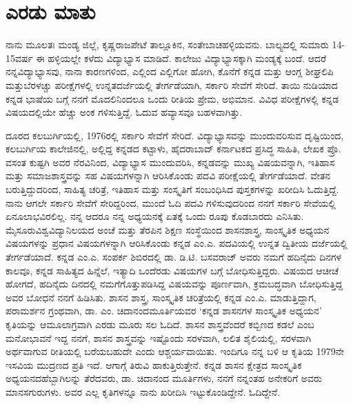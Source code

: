 
\chapter{ಎರಡು ಮಾತು}

ನಾನು ಮೂಲತಃ ಮಂಡ್ಯ ಜಿಲ್ಲೆ, ಕೃಷ್ಣರಾಜಪೇಟೆ ತಾಲ್ಲೂಕಿನ, ಸಂತೇಬಾಚಹಳ್ಳಿಯವನು. ಬಾಲ್ಯದಲ್ಲಿ ಸುಮಾರು 14-15\break ವರ್ಷ ಈ ಹಳ್ಳಿಯಲ್ಲೇ ಕಳೆದು ವಿದ್ಯಾಭ್ಯಾಸ ಮಾಡಿದೆ. ಕಾಲೇಜು ವಿದ್ಯಾಭ್ಯಾಸಕ್ಕಾಗಿ ಮಂಡ್ಯಕ್ಕೆ ಬಂದೆ. ಆದರೆ ನನ್ನ\break ವಿದ್ಯಾಭ್ಯಾಸವು, ನಾನಾ ಕಾರಣಗಳಿಂದ, ಎಲ್ಲಿಂದ ಎಲ್ಲಿಗೋ ಹೋಗಿ, ಕೊನೆಗೆ ಕನ್ನಡ ಮತ್ತು ಆಂಗ್ಲ ಶೀಘ್ರಲಿಪಿ ಮತ್ತು\break ಬೆರಳಚ್ಚು ಪರೀಕ್ಷೆಗಳಲ್ಲಿ ಉನ್ನತದರ್ಜೆಯಲ್ಲಿ ತೇರ್ಗಡೆಯಾಗಿ, ಸರ್ಕಾರಿ ಸೇವೆಗೆ ಸೇರಿದೆ. ತಾಯಿ ನುಡಿಯಾದ ಕನ್ನಡ ಭಾಷೆಯ ಬಗ್ಗೆ ನನಗೆ ಮೊದಲಿನಿಂದಲೂ ಒಂದು ರೀತಿಯ ಪ್ರೇಮ, ಅಭಿಮಾನ. ವಿವಿಧ ಪರೀಕ್ಷೆಗಳಲ್ಲಿ ಕನ್ನಡ ವಿಷಯದಲ್ಲಿಯೇ ಹೆಚ್ಚು ಅಂಕ ಗಳಿಸುತ್ತಿದ್ದೆ. ಓದುವ ಹವ್ಯಾಸವೂ ಬಹಳವಾಗಿತ್ತು. 

ದೂರದ ಕಲಬುರ್ಗಿಯಲ್ಲಿ, 1976ರಲ್ಲಿ ಸರ್ಕಾರಿ ಸೇವೆಗೆ ಸೇರಿದೆ. ವಿದ್ಯಾಭ್ಯಾಸವನ್ನು ಮುಂದುವರಿಸುವ ದೃಷ್ಟಿಯಿಂದ, ಕಲಬುರ್ಗಿಯ ಕಾಲೇಜಿನಲ್ಲಿ, ಅಲ್ಲಿದ್ದ ಕನ್ನಡದ ಕಟ್ಟಾಳು, ಹೈದರಾಬಾದ್​ ಕರ್ನಾಟಕದ ಪ್ರಸಿದ್ಧ ಸಾಹಿತಿ, ಲೇಖಕ ಪ್ರೊ. ವಸಂತ ಕುಷ್ಟಗಿ ಅವರ ನೆರವಿನಿಂದ, ವಿದ್ಯಾಭ್ಯಾಸ ಮುಂದುವರಿಸಿ, ಕನ್ನಡವನ್ನು ಮುಖ್ಯ ವಿಷಯವನ್ನಾಗಿ, ಇತಿಹಾಸ ಮತ್ತು ಸಮಾಜಶಾಸ್ತ್ರವನ್ನು ಸಹ ವಿಷಯಗಳನ್ನಾಗಿ ಆರಿಸಿಕೊಂಡು ಪದವಿ ಪರೀಕ್ಷೆಯಲ್ಲಿ ತೇರ್ಗಡೆಯಾದೆ. ವೇತನ ಬರುತ್ತಿದ್ದುದರಿಂದ, ಸಾಹಿತ್ಯ ಚರಿತ್ರೆ, ಇತಿಹಾಸ ಮತ್ತು ಸಂಸ್ಕೃತಿಗೆ ಸಂಬಂಧಿಸಿದ ಪುಸ್ತಕಗಳನ್ನು ಖರೀದಿಸಿ ಓದುತ್ತಿದ್ದೆ. ನಾನು ಆಗಲೇ ಸರ್ಕಾರಿ ಸೇವೆಗೆ ಸೇರಿದ್ದರಿಂದ, ಮುಂದೆ ಓದಿ ಪದವಿ ಗಳಿಸುವುದರಿಂದ ನನಗೆ ಸರ್ಕಾರಿ ಸೇವೆಯಲ್ಲಿ ಏನೂ\break ಲಾಭವಿರಲಿಲ್ಲ. ನನ್ನ ಆದರೂ ನನ್ನ ಅಧ್ಯಯನಕ್ಕೆ ಏತಕ್ಕೆ ಒಂದು ರೂಪು ಕೊಡಬಾರದು ಎನಿಸಿತು. ಮೈಸೂರು\break ವಿಶ್ವವಿದ್ಯಾನಿಲಯದ ಅಂಚೆ ಮತ್ತು ತೆರಪಿನ ಶಿಕ್ಷಣ ಸಂಸ್ಥೆಯಿಂದ ಶಾಸನಶಾಸ್ತ್ರ, ಸಾಂಸ್ಕೃತಿಕ ಅಧ್ಯಯನ ವಿಷಯಗಳನ್ನು ಪ್ರಧಾನ ವಿಷಯಗಳನ್ನಾಗಿ ಆರಿಸಿಕೊಂಡು ಕನ್ನಡ ಎಂ.ಎ. ಪದವಿಯಲ್ಲಿ ಉನ್ನತ ದ್ವಿತೀಯ ದರ್ಜೆಯಲ್ಲಿ ತೇರ್ಗಡೆಯಾದೆ. ಕನ್ನಡ ಎಂ.ಎ. ಸಂಪರ್ಕ ಶಿಬಿರದಲ್ಲಿ ಡಾ. ಡಿ.ಟಿ. ಬಸವರಾಜ್​ ಅವರು ನಮಗೆ ಹದಿನೈದು ದಿನಗಳ ಕಾಲವೂ, ಕನ್ನಡ ಸಾಹಿತ್ಯದ ಹಿನ್ನೆಲೆ, ಇತ್ಯಾದಿ ಒಂದೆರಡು ವಿಷಯಗಳ ಬಗ್ಗೆ ಬೋಧಿಸುತ್ತಿದ್ದರು. ವಿಷಯದ ಆಚೀಚೆ ಹೋಗದೆ, ಹದಿನೈದು ದಿನದಲ್ಲಿ ನಮಗೆ\break ಗೊತ್ತುಪಡಿಸಿದ್ದ ವಿಷಯವನ್ನು ಪೂರ್ಣವಾಗಿ, ಕ್ರಮಬದ್ಧವಾಗಿ ಬೋಧಿಸುತ್ತಿದ್ದ ಅವರ ಬೋಧನೆ ನನಗೆ ಹಿಡಿಸಿತು. ಶಾಸನ ಶಾಸ್ತ್ರ, ಸಾಂಸ್ಕೃತಿಕ ಚರಿತ್ರೆಯಲ್ಲಿ ಕನ್ನಡ ಎಂ.ಎ. ಮಾಡುತ್ತಿದ್ದಾಗ, ಪರಾಮರ್ಶನ ಗ್ರಂಥವಾಗಿ, ಡಾ. ಎಂ. ಚಿದಾನಂದಮೂರ್ತಿಯವರ ‘ಕನ್ನಡ ಶಾಸನಗಳ ಸಾಂಸ್ಕೃತಿಕ ಅಧ್ಯಯನ’ ಕೃತಿಯನ್ನು ಆಮೂಲಾಗ್ರವಾಗಿ ಎರಡು ಮೂರು ಸಲ ಓದಿದೆ. ಶಾಸನ ಶಾಸ್ತ್ರ\-ವೆಂದರೆ ಕಬ್ಬಿಣದ ಕಡಲೆ ಎಂಬ ಮನೋಭಾವನೆ ಇದ್ದ ನನಗೆ, ಶಾಸನ ಶಾಸ್ತ್ರವನ್ನು ಇಷ್ಟೊಂದು ಸರಳ\-ವಾಗಿ, ಲಲಿತ ಶೈಲಿಯಲ್ಲಿ, ಸರಳವಾಗಿ ಅರ್ಥವಾಗುವ ರೀತಿಯಲ್ಲಿ ಬರೆಯಬಹುದೇ ಎಂದು ಆಶ್ಚರ್ಯವಾಯಿತು. ಇಂದಿಗೂ ನನ್ನ ಬಳಿ ಆ ಕೃತಿಯ 1979ನೇ ಇಸವಿಯ ಮುದ್ರಣದ ಪ್ರತಿ ಇದೆ. ಆಗಾಗ್ಗೆ ತಿರುವಿ ಹಾಕುತ್ತಿರುತ್ತೇನೆ. ಕನ್ನಡ ಶಾಸನ ಕ್ಷೇತ್ರದ ಸಾಂಸ್ಕೃತಿಕ ಅಧ್ಯಯನದ\break ಹೆಬ್ಬಾಗಿಲನ್ನು ತೆರೆದವರು, ಡಾ. ಚಿದಾನಂದ ಮೂರ್ತಿಗಳು, ನನಗೆ ನನ್ನಂತಹ ಅನೇಕರಿಗೆ ಅವರು ಮಾನಸಗುರುಗಳು. ಅವರ ಎಲ್ಲ ಕೃತಿಗಳನ್ನೂ ನಾನು ಖರೀದಿಸಿ ಇಟ್ಟುಕೊಂಡಿದ್ದೇನೆ. ಓದಿದ್ದೇನೆ.

